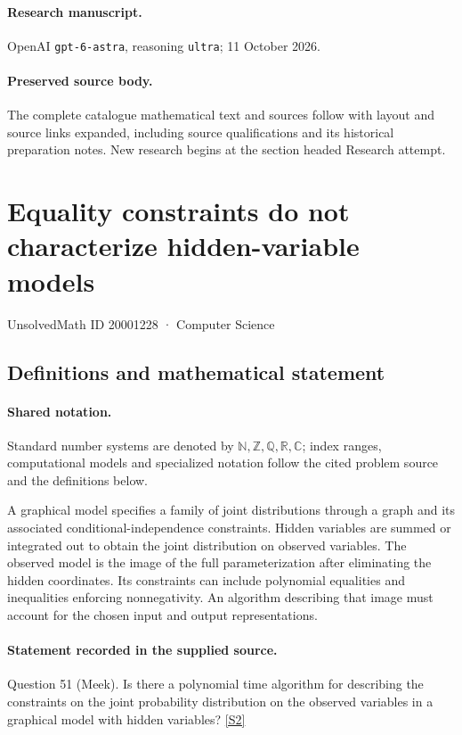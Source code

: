\documentclass[11pt]{article}
\begin{document}
\paragraph{Research manuscript.} OpenAI \texttt{gpt-6-astra}, reasoning \texttt{ultra}; 11 October 2026.
\paragraph{Preserved source body.} The complete catalogue mathematical text and sources follow with layout and source links expanded, including source qualifications and its historical preparation notes. New research begins at the section headed Research attempt.

\section{Equality constraints do not characterize hidden-variable models}\label{20001228}
{\small UnsolvedMath ID 20001228 · Computer Science}
\subsection{Definitions and mathematical statement}

\paragraph{Shared notation.}Standard number systems are denoted by $\mathbb N,\mathbb Z,\mathbb Q,\mathbb R,\mathbb C$; index ranges, computational models and specialized notation follow the cited problem source and the definitions below.


A graphical model specifies a family of joint distributions through a graph and its associated conditional-independence constraints. Hidden variables are summed or integrated out to obtain the joint distribution on observed variables. The observed model is the image of the full parameterization after eliminating the hidden coordinates. Its constraints can include polynomial equalities and inequalities enforcing nonnegativity. An algorithm describing that image must account for the chosen input and output representations.
\paragraph{Statement recorded in the supplied source.}
Question 51 (Meek). Is there a polynomial time algorithm for describing the constraints on the joint probability distribution on the observed variables in a graphical model with hidden variables? \href{https://aimath.org/WWN/compalgstat/compalgstat.pdf}{[S2]}
\end{document}
